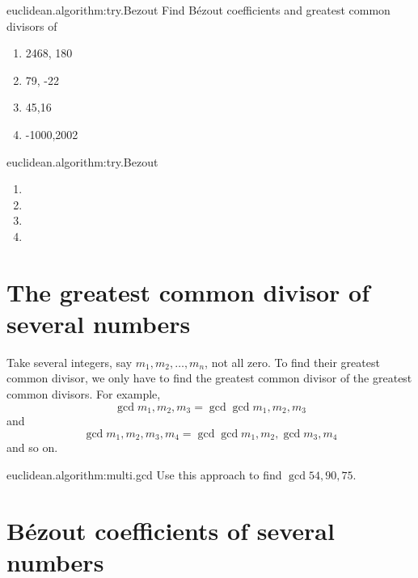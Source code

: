 \begin{problem}{euclidean.algorithm:try.Bezout}
Find B\'ezout coefficients and greatest common divisors of
\begin{enumerate}
\item 2468, 180
\item 79, -22
\item 45,16
\item -1000,2002
\end{enumerate}
\end{problem}
\begin{answer}{euclidean.algorithm:try.Bezout}
\begin{enumerate}
\item
{}
\item
{}
\item
{}
\item
{}
\end{enumerate}
\end{answer}


\section{The greatest common divisor of several numbers}

Take several integers, say \(m_1, m_2, \dots, m_n\), not all zero.
To find their greatest common divisor, we only have to find the greatest common divisor of the greatest common divisors.
For example,
\[
\gcd{m_1, m_2, m_3}
=\gcd{\gcd{m_1, m_2}, m_3}
\]
and
\[
\gcd{m_1, m_2, m_3,m_4}
=\gcd{\gcd{m_1, m_2}, \gcd{m_3,m_4}}
\]
and so on.

\begin{problem}{euclidean.algorithm:multi.gcd}
Use this approach to find \(\gcd{54,90,75}\).
\end{problem}


\section{B\'ezout coefficients of several numbers}

